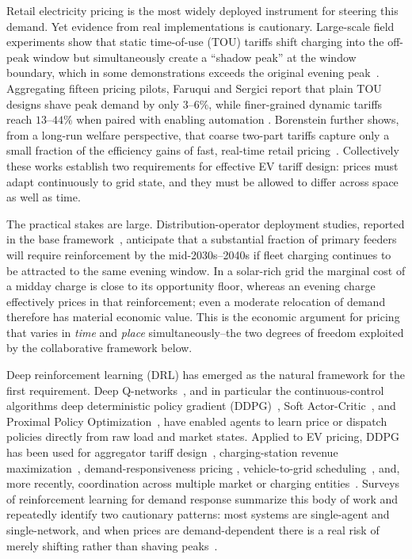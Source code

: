 \documentclass[10pt,journal]{IEEEtran}
\begin{document}
Retail electricity pricing is the most widely deployed instrument for
steering this demand. Yet evidence from real implementations is cautionary.
Large-scale field experiments show that static time-of-use (TOU) tariffs
shift charging into the off-peak window but simultaneously create a
``shadow peak'' at the window boundary, which in some demonstrations
exceeds the original evening peak~\cite{bailey2025,samende2025,jones2022}.
Aggregating fifteen pricing pilots, Faruqui and Sergici report that plain
TOU designs shave peak demand by only $3$--$6\%$, while finer-grained
dynamic tariffs reach $13$--$44\%$ when paired with enabling automation
\cite{faruqui2010}. Borenstein further shows, from a long-run welfare
perspective, that coarse two-part tariffs capture only a small fraction of
the efficiency gains of fast, real-time retail pricing~\cite{borenstein2005}.
Collectively these works establish two requirements for effective EV tariff
design: prices must adapt continuously to grid state, and they must be
allowed to differ across space as well as time.

The practical stakes are large. Distribution-operator deployment studies,
reported in the base framework~\cite{lepolesa2026}, anticipate that a
substantial fraction of primary feeders will require reinforcement by the
mid-2030s--2040s if fleet charging continues to be attracted to the same
evening window. In a solar-rich grid the marginal cost of a midday charge
is close to its opportunity floor, whereas an evening charge effectively
prices in that reinforcement; even a moderate relocation of demand
therefore has material economic value. This is the economic argument for
pricing that varies in \emph{time} and \emph{place} simultaneously--the
two degrees of freedom exploited by the collaborative framework below.

Deep reinforcement learning (DRL) has emerged as the natural framework for
the first requirement. Deep Q-networks~\cite{mnih2015}, and in particular
the continuous-control algorithms deep deterministic policy gradient
(DDPG)~\cite{lillicrap2016}, Soft Actor-Critic~\cite{haarnoja2018}, and
Proximal Policy Optimization~\cite{schulman2017}, have enabled agents to
learn price or dispatch policies directly from raw load and market states.
Applied to EV pricing, DDPG has been used for aggregator tariff
design~\cite{qiu2020tia,liu2021access}, charging-station revenue
maximization~\cite{zhao2022tte}, demand-responsiveness pricing
\cite{lai2022tsg,cui2021tsg}, vehicle-to-grid scheduling~\cite{aljafari2023},
and, more recently, coordination across multiple market or charging
entities~\cite{ye2022,yang2024,paudel2023}. Surveys of reinforcement learning
for demand response summarize this body of work and repeatedly identify two
cautionary patterns: most systems are single-agent and single-network, and
when prices are demand-dependent there is a real risk of merely shifting
rather than shaving peaks~\cite{vazquez2019}.
\end{document}
